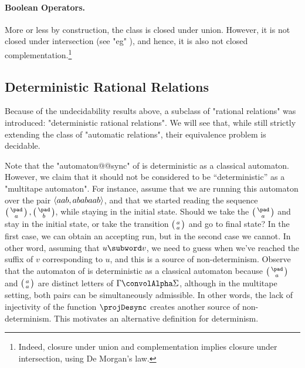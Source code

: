 \paragraph*{Boolean Operators.}
More or less by construction, the class is closed under union.
However, it is not closed under intersection
(see "eg" \cite[\S~III, Example~2.5]{Berstel1979Transductions}),
and hence, it is also not closed complementation.\footnote{Indeed, closure under union and complementation implies closure under intersection, using De Morgan's law.}

\subsection{Deterministic Rational Relations}

Because of the undecidability results above, a subclass of "rational relations" was introduced:
"deterministic rational relations". We will see that, while still strictly extending the class of
"automatic relations", their equivalence problem is decidable.

Note that the "automaton@@sync" of  is deterministic
as a classical automaton. However, we claim that it should not be considered to be ``deterministic''
as a "multitape automaton".
For instance, assume that we are running this automaton over the pair
$\langle aab, ababaab\rangle$, and that we started reading the sequence $\pair{\pad}{a}, \pair{\pad}{b}$,
while staying in the initial state. Should we take the
$\pair{\pad}{a}$ and stay in the initial state, or take the transition $\pair{a}{a}$ and go to 
final state? In the first case, we can obtain an accepting run, but in the second case we cannot.
In other word, assuming that $u \subword v$, we need to guess when we've reached the suffix of
$v$ corresponding to $u$, and this is a source of non-determinism. Observe that
the automaton of  is deterministic as a classical automaton
because $\pair{\pad}{a}$ and $\pair{a}{a}$ are distinct letters of $\Gamma\convolAlpha\Sigma$, 
although in the multitape setting, both pairs can be simultaneously admissible.
In other words, the lack of injectivity of the function $\projDesync$ creates another
source of non-determinism. This motivates an alternative definition for determinism.

